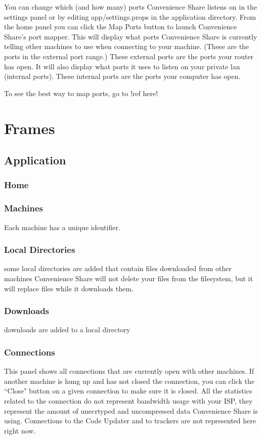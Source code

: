 \documentclass{article}
\begin{document}
You can change which (and how many) ports Convenience Share listens on in the settings panel or by editing app/settings.props in the application directory.
From the home panel you can click the Map Ports button to launch Convenience Share's port mapper.
This will display what ports Convenience Share is currently telling other machines to use when connecting to your machine.
(These are the ports in the external port range.) These external ports are the ports your router has open.
It will also display what ports it uses to listen on your private lan (internal ports).
These internal ports are the ports your computer has open.

To see the best way to map ports, go to !ref here!

\section{Frames}

\subsection{Application}

\subsubsection{Home}

\subsubsection{Machines}

Each machine has a unique identifier.

\subsubsection{Local Directories}

some local directories are added that contain files downloaded from other machines
Convenience Share will not delete your files from the filesystem, but it will replace files while it downloads them.


\subsubsection{Downloads}

downloads are added to a local directory


\subsubsection{Connections}
This panel shows all connections that are currently open with other machines.
If another machine is hung up and has not closed the connection, you can click the ``Close" button on a given connection to make sure it is closed.
All the statistics related to the connection do not represent bandwidth usage with your ISP, they represent the amount of unecrtyped and uncompressed data Convenience Share is using.
Connections to the Code Updater and to trackers are not represented here right now.
\end{document}

